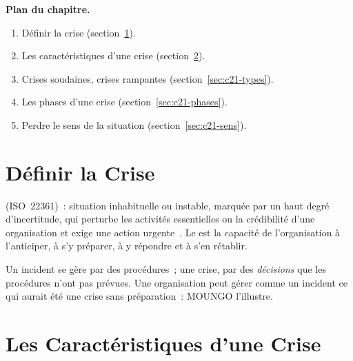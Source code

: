 \medskip
\textbf{Plan du chapitre.}
\begin{enumerate}
    \item Définir la crise (section~\ref{sec:c21-definir}).
    \item Les caractéristiques d'une crise (section~\ref{sec:c21-caracteres}).
    \item Crises soudaines, crises rampantes (section~\ref{sec:c21-types}).
    \item Les phases d'une crise (section~\ref{sec:c21-phases}).
    \item Perdre le sens de la situation (section~\ref{sec:c21-sens}).
\end{enumerate}

\separateur

\section{Définir la Crise}
\label{sec:c21-definir}

\begin{boxdef}
 (ISO~22361)~: situation inhabituelle ou instable,
marquée par un haut degré d'incertitude, qui perturbe les activités
essentielles ou la crédibilité d'une organisation et exige une action
urgente~\cite{iso22361_2022}. Le  est la
capacité de l'organisation à l'anticiper, à s'y préparer, à y répondre et
à s'en rétablir.
\end{boxdef}

Un incident se gère par des procédures~; une crise, par des
\emph{décisions} que les procédures n'ont pas prévues. Une organisation
peut gérer comme un incident ce qui aurait été une crise sans préparation~:
MOUNGO l'illustre.

\section{Les Caractéristiques d'une Crise}
\label{sec:c21-caracteres}


